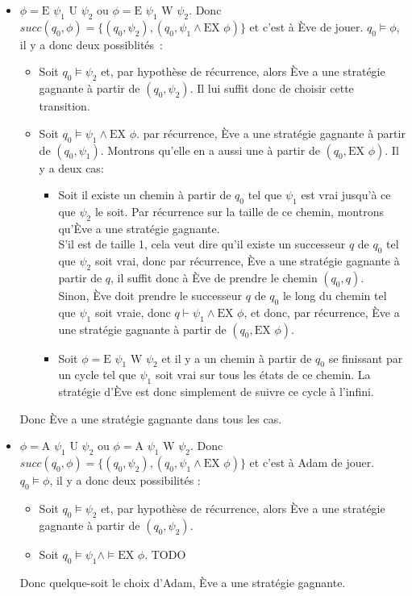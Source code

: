 \documentclass[10pt,a4paper]{article}
\begin{document}
\begin{itemize}
\item $\phi = \mbox{E } \psi_1 \mbox{ U } \psi_2$ ou $\phi = \mbox{E } \psi_1 \mbox{ W } \psi_2$. Donc $succ(q_0,\phi) = \{ (q_0,\psi_2), (q_0,\psi_1 \land \mbox{EX } \phi) \}$ et c'est à Ève de jouer. $q_0 \vDash \phi$, il y a donc deux possiblités :
\begin{itemize}
	\item Soit $q_0 \vDash \psi_2$ et, par hypothèse de récurrence, alors Ève a une stratégie gagnante à partir de $(q_0,\psi_2)$. Il lui suffit donc de choisir cette transition.
	\item Soit $q_0 \vDash \psi_1 \land \mbox{EX } \phi$.
	par récurrence, Ève a une stratégie gagnante à partir de $(q_0,\psi_1)$.
	Montrons qu'elle en a aussi une à partir de $(q_0,\mbox{EX } \phi)$.
	Il y a deux cas:
	\begin{itemize}
		\item Soit il existe un chemin à partir de $q_0$ tel que $\psi_1$ est vrai jusqu'à ce que $\psi_2$ le soit. Par récurrence sur la taille de ce chemin, montrons qu'Ève a une stratégie gagnante.\\
		S'il est de taille 1, cela veut dire qu'il existe un successeur $q$ de $q_0$ tel que $\psi_2$ soit vrai, donc par récurrence, Ève a une stratégie gagnante à partir de $q$, il suffit donc à Ève de prendre le chemin $(q_0,q)$.\\
		Sinon, Ève doit prendre le successeur $q$ de $q_0$ le long du chemin tel que $\psi_1$ soit vraie, donc $q \vdash \psi_1 \land \mbox{EX } \phi$, et donc, par récurrence, Ève a une stratégie gagnante à partir de $(q_0,\mbox{EX } \phi)$.
		\item Soit $\phi = \mbox{E } \psi_1 \mbox{ W } \psi_2$ et il y a un chemin à partir de $q_0$ se finissant par un cycle tel que $\psi_1$ soit vrai sur tous les états de ce chemin. La stratégie d'Ève est donc simplement de suivre ce cycle à l'infini.
	\end{itemize}
\end{itemize}
Donc Ève a une stratégie gagnante dans tous les cas.

\item $\phi = \mbox{A } \psi_1 \mbox{ U } \psi_2$ ou $\phi = \mbox{A } \psi_1 \mbox{ W } \psi_2$. Donc $succ(q_0,\phi) = \{ (q_0,\psi_2), (q_0,\psi_1 \land \mbox{EX } \phi) \}$ et c'est à Adam de jouer. $q_0 \vDash \phi$, il y a donc deux possibilités :
\begin{itemize}
	\item Soit $q_0 \vDash \psi_2$ et, par hypothèse de récurrence, alors Ève a une stratégie gagnante à partir de $(q_0,\psi_2)$.
	\item Soit $q_0 \vDash \psi_1 \land \vDash \mbox{EX } \phi$. TODO
\end{itemize}
Donc quelque-soit le choix d'Adam, Ève a une stratégie gagnante.
\end{itemize}
\end{document}
